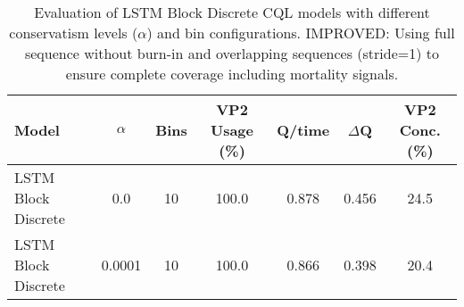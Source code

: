 \begin{table}[ht]
\centering
\caption{Evaluation of LSTM Block Discrete CQL models with different conservatism levels ($\alpha$) and bin configurations. IMPROVED: Using full sequence without burn-in and overlapping sequences (stride=1) to ensure complete coverage including mortality signals.}
\label{tab:lstm_cql_evaluation_improved}
\begin{tabular}{lcccccc}
\toprule
Model & $\alpha$ & Bins & VP2 Usage (\%) & Q/time & $\Delta$Q & VP2 Conc. (\%) \\
\midrule
LSTM Block Discrete & 0.0 & 10 & 100.0 & 0.878 & 0.456 & 24.5 \\
LSTM Block Discrete & 0.0001 & 10 & 100.0 & 0.866 & 0.398 & 20.4 \\
\bottomrule
\end{tabular}
\end{table}